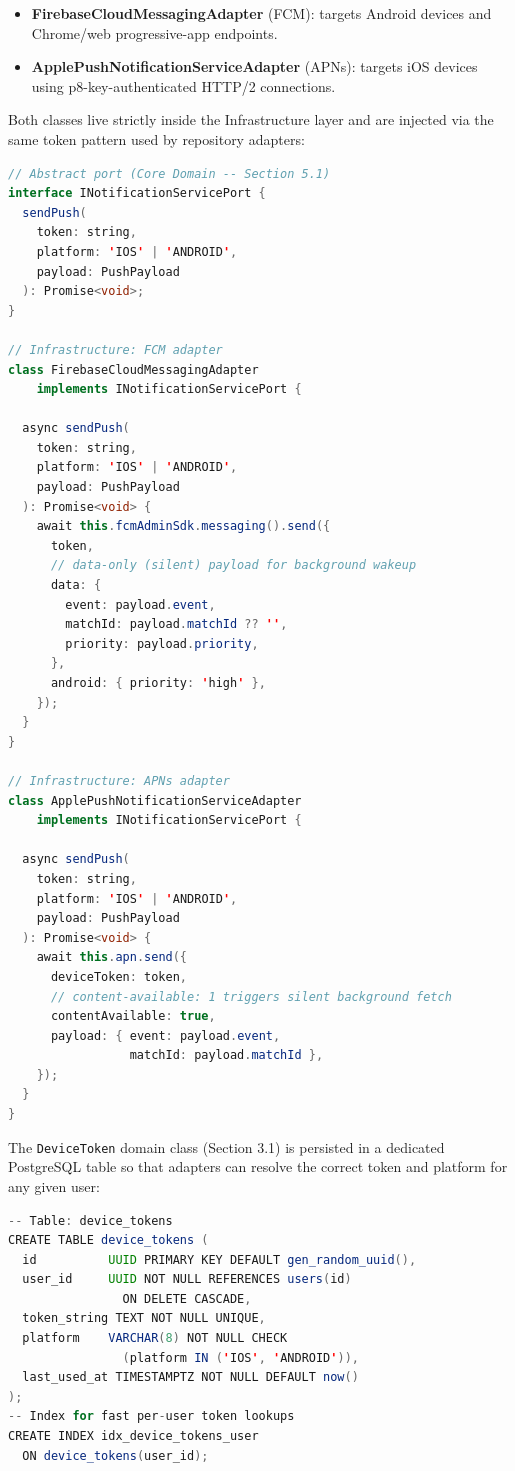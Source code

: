 \documentclass[11pt,a4paper]{report}
\begin{document}
\begin{itemize}
  \item \textbf{FirebaseCloudMessagingAdapter} (FCM): targets Android devices and Chrome/web progressive-app endpoints.
  \item \textbf{ApplePushNotificationServiceAdapter} (APNs): targets iOS devices using p8-key-authenticated HTTP/2 connections.
\end{itemize}

Both classes live strictly inside the Infrastructure layer and are injected via the same token pattern used by repository adapters:

\begin{lstlisting}[language=Java, caption={FCM and APNs adapter classes implementing INotificationServicePort}]
// Abstract port (Core Domain -- Section 5.1)
interface INotificationServicePort {
  sendPush(
    token: string,
    platform: 'IOS' | 'ANDROID',
    payload: PushPayload
  ): Promise<void>;
}

// Infrastructure: FCM adapter
class FirebaseCloudMessagingAdapter
    implements INotificationServicePort {

  async sendPush(
    token: string,
    platform: 'IOS' | 'ANDROID',
    payload: PushPayload
  ): Promise<void> {
    await this.fcmAdminSdk.messaging().send({
      token,
      // data-only (silent) payload for background wakeup
      data: {
        event: payload.event,
        matchId: payload.matchId ?? '',
        priority: payload.priority,
      },
      android: { priority: 'high' },
    });
  }
}

// Infrastructure: APNs adapter
class ApplePushNotificationServiceAdapter
    implements INotificationServicePort {

  async sendPush(
    token: string,
    platform: 'IOS' | 'ANDROID',
    payload: PushPayload
  ): Promise<void> {
    await this.apn.send({
      deviceToken: token,
      // content-available: 1 triggers silent background fetch
      contentAvailable: true,
      payload: { event: payload.event,
                 matchId: payload.matchId },
    });
  }
}
\end{lstlisting}

The \texttt{DeviceToken} domain class (Section 3.1) is persisted in a dedicated PostgreSQL table so that adapters can resolve the correct token and platform for any given user:

\begin{lstlisting}[language=Java, caption={DeviceToken PostgreSQL table schema}]
-- Table: device_tokens
CREATE TABLE device_tokens (
  id          UUID PRIMARY KEY DEFAULT gen_random_uuid(),
  user_id     UUID NOT NULL REFERENCES users(id)
                ON DELETE CASCADE,
  token_string TEXT NOT NULL UNIQUE,
  platform    VARCHAR(8) NOT NULL CHECK
                (platform IN ('IOS', 'ANDROID')),
  last_used_at TIMESTAMPTZ NOT NULL DEFAULT now()
);
-- Index for fast per-user token lookups
CREATE INDEX idx_device_tokens_user
  ON device_tokens(user_id);
\end{lstlisting}
\end{document}
